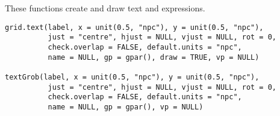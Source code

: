 %
\begin{Description}\relax
These functions create and draw text and  expressions.
\end{Description}
%
\begin{Usage}
\begin{verbatim}
grid.text(label, x = unit(0.5, "npc"), y = unit(0.5, "npc"), 
          just = "centre", hjust = NULL, vjust = NULL, rot = 0,
          check.overlap = FALSE, default.units = "npc",
          name = NULL, gp = gpar(), draw = TRUE, vp = NULL)

textGrob(label, x = unit(0.5, "npc"), y = unit(0.5, "npc"), 
          just = "centre", hjust = NULL, vjust = NULL, rot = 0,
          check.overlap = FALSE, default.units = "npc",
          name = NULL, gp = gpar(), vp = NULL)
\end{verbatim}
\end{Usage}
%
